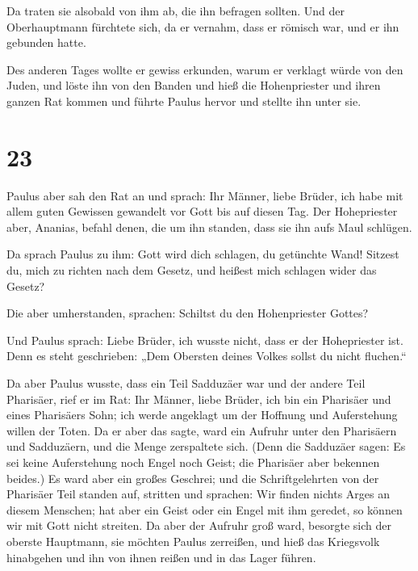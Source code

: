  Da traten sie alsobald von ihm ab, die ihn befragen
sollten. Und der Oberhauptmann fürchtete sich, da er vernahm, dass er
römisch war, und er ihn gebunden hatte.

 Des anderen Tages wollte er gewiss erkunden, warum er
verklagt würde von den Juden, und löste ihn von den Banden und hieß die
Hohenpriester und ihren ganzen Rat kommen und führte Paulus hervor und
stellte ihn unter sie.

\hypertarget{section-22}{%
\section{23}\label{section-22}}

 Paulus aber sah den Rat an und sprach: Ihr Männer, liebe
Brüder, ich habe mit allem guten Gewissen gewandelt vor Gott bis auf
diesen Tag.  Der Hohepriester aber, Ananias, befahl denen,
die um ihn standen, dass sie ihn aufs Maul schlügen.

 Da sprach Paulus zu ihm: Gott wird dich schlagen, du
getünchte Wand! Sitzest du, mich zu richten nach dem Gesetz, und heißest
mich schlagen wider das Gesetz?

 Die aber umherstanden, sprachen: Schiltst du den
Hohenpriester Gottes?

 Und Paulus sprach: Liebe Brüder, ich wusste nicht, dass
er der Hohepriester ist. Denn es steht geschrieben: „Dem Obersten deines
Volkes sollst du nicht fluchen.``

 Da aber Paulus wusste, dass ein Teil Sadduzäer war und
der andere Teil Pharisäer, rief er im Rat: Ihr Männer, liebe Brüder, ich
bin ein Pharisäer und eines Pharisäers Sohn; ich werde angeklagt um der
Hoffnung und Auferstehung willen der Toten.  Da er aber
das sagte, ward ein Aufruhr unter den Pharisäern und Sadduzäern, und die
Menge zerspaltete sich.  (Denn die Sadduzäer sagen: Es sei
keine Auferstehung noch Engel noch Geist; die Pharisäer aber bekennen
beides.)  Es ward aber ein großes Geschrei; und die
Schriftgelehrten von der Pharisäer Teil standen auf, stritten und
sprachen: Wir finden nichts Arges an diesem Menschen; hat aber ein Geist
oder ein Engel mit ihm geredet, so können wir mit Gott nicht streiten.
 Da aber der Aufruhr groß ward, besorgte sich der oberste
Hauptmann, sie möchten Paulus zerreißen, und hieß das Kriegsvolk
hinabgehen und ihn von ihnen reißen und in das Lager führen.


